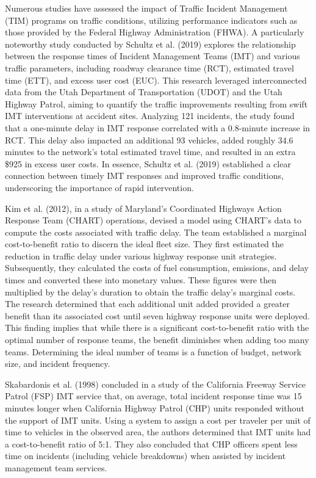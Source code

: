 \documentclass[fancy, oneside, mastersfancy, ms]{byuthesis}
\begin{document}
Numerous studies have assessed the impact of Traffic Incident Management
(TIM) programs on traffic conditions, utilizing performance indicators
such as those provided by the Federal Highway Administration (FHWA). A
particularly noteworthy study conducted by Schultz et al. (2019)
explores the relationship between the response times of Incident
Management Teams (IMT) and various traffic parameters, including roadway
clearance time (RCT), estimated travel time (ETT), and excess user cost
(EUC). This research leveraged interconnected data from the Utah
Department of Transportation (UDOT) and the Utah Highway Patrol, aiming
to quantify the traffic improvements resulting from swift IMT
interventions at accident sites. Analyzing 121 incidents, the study
found that a one-minute delay in IMT response correlated with a
0.8-minute increase in RCT. This delay also impacted an additional 93
vehicles, added roughly 34.6 minutes to the network's total estimated
travel time, and resulted in an extra \$925 in excess user costs. In
essence, Schultz et al. (2019) established a clear connection between
timely IMT responses and improved traffic conditions, underscoring the
importance of rapid intervention.

Kim et al. (2012), in a study of Maryland's Coordinated Highways Action
Response Team (CHART) operations, devised a model using CHART's data to
compute the costs associated with traffic delay. The team established a
marginal cost-to-benefit ratio to discern the ideal fleet size. They
first estimated the reduction in traffic delay under various highway
response unit strategies. Subsequently, they calculated the costs of
fuel consumption, emissions, and delay times and converted these into
monetary values. These figures were then multiplied by the delay's
duration to obtain the traffic delay's marginal costs. The research
determined that each additional unit added provided a greater benefit
than its associated cost until seven highway response units were
deployed. This finding implies that while there is a significant
cost-to-benefit ratio with the optimal number of response teams, the
benefit diminishes when adding too many teams. Determining the ideal
number of teams is a function of budget, network size, and incident
frequency.

Skabardonis et al. (1998) concluded in a study of the California Freeway
Service Patrol (FSP) IMT service that, on average, total incident
response time was 15 minutes longer when California Highway Patrol (CHP)
units responded without the support of IMT units. Using a system to
assign a cost per traveler per unit of time to vehicles in the observed
area, the authors determined that IMT units had a cost-to-benefit ratio
of 5:1. They also concluded that CHP officers spent less time on
incidents (including vehicle breakdowns) when assisted by incident
management team services.
\end{document}
